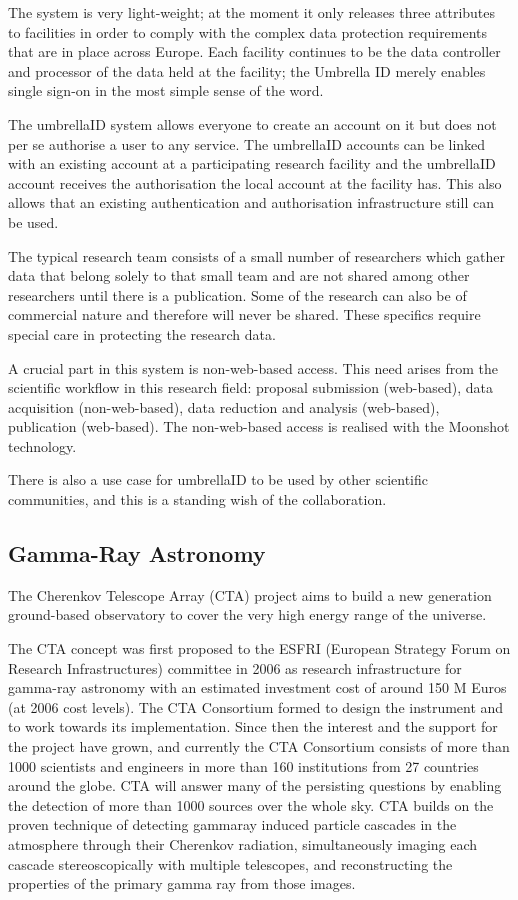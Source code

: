 \documentclass[fleqn,10pt]{wlscirep}
\begin{document}
{The system is very light-weight; at the moment it only releases three attributes to facilities in order to comply with the complex data protection requirements that are in place across Europe. Each facility continues to be the data controller and processor of the data held at the facility; the Umbrella ID merely enables single sign-on in the most simple sense of the word.
 
The umbrellaID system allows everyone to create an account on it but does not per se authorise a user to any service. The umbrellaID accounts can be linked with an existing account at a participating research facility and the umbrellaID account receives the authorisation the local account at the facility has. This also allows that an existing authentication and authorisation infrastructure still can be used.
 
The typical research team consists of a small number of researchers which gather data that belong solely to that small team and are not shared among other researchers until there is a publication. Some of the research can also be of commercial nature and therefore will never be shared. These specifics require special care in protecting the research data.
 
A crucial part in this system is non-web-based access. This need arises from the scientific workflow in this research field: proposal submission (web-based), data acquisition (non-web-based), data reduction and analysis (web-based), publication (web-based). The non-web-based access is realised with the Moonshot technology.

There is also a use case for umbrellaID to be used by other scientific communities, and this is a standing wish of the collaboration.

\subsection{Gamma-Ray Astronomy}
The Cherenkov Telescope Array (CTA) project aims to build a new generation ground-based observatory to cover the very high energy range of the universe.

The CTA concept was first proposed to the ESFRI (European Strategy Forum on Research Infrastructures) committee in 2006 as research infrastructure for gamma-ray astronomy with an estimated investment cost of around 150 M Euros (at 2006 cost levels). The CTA Consortium formed to design the instrument and to work towards its implementation. Since then the interest and the support for the project have grown, and currently the CTA Consortium consists of more than 1000 scientists and engineers in more than 160 institutions from 27 countries around the globe. CTA will answer many of the persisting questions by enabling the detection of more than 1000 sources over the whole sky. CTA builds on the proven technique of detecting gamma\-ray induced particle cascades in the atmosphere through their Cherenkov radiation, simultaneously imaging each cascade stereoscopically with multiple telescopes, and reconstructing the properties of the primary gamma ray from those images.\cite{cta-intro}
 
}
\end{document}
